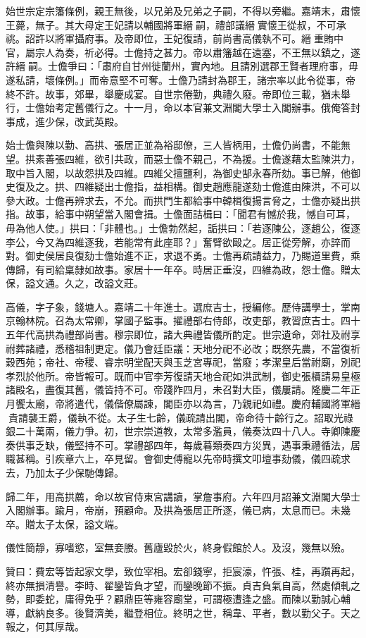 \begin{pinyinscope}
始世宗定宗籓條例，親王無後，以兄弟及兄弟之子嗣，不得以旁繼。嘉靖末，肅懷王薨，無子。其大母定王妃請以輔國將軍縉𤏳嗣，禮部議縉𤏳實懷王從叔，不可承祧。詔許以將軍攝府事。及帝即位，王妃復請，前尚書高儀執不可。縉𤏳重賄中官，屬宗人為奏，祈必得。士儋持之甚力。帝以肅籓越在遠塞，不王無以鎮之，遂許縉𤏳嗣。士儋爭曰：「肅府自甘州徙蘭州，實內地。且請別選郡王賢者理府事，毋遂私請，壞條例。」而帝意堅不可奪。士儋乃請封為郡王，諸宗率以此令從事，帝終不許。故事，郊畢，舉慶成宴。自世宗倦勤，典禮久廢。帝即位三載，猶未舉行，士儋始考定舊儀行之。十一月，命以本官兼文淵閣大學士入閣辦事。俄俺答封事成，進少保，改武英殿。

始士儋與陳以勤、高拱、張居正並為裕邸僚，三人皆柄用，士儋仍尚書，不能無望。拱素善張四維，欲引共政，而惡士儋不親己，不為援。士儋遂藉太監陳洪力，取中旨入閣，以故怨拱及四維。四維父擅鹽利，為御史郜永春所劾。事已解，他御史復及之。拱、四維疑出士儋指，益相構。御史趙應龍遂劾士儋進由陳洪，不可以參大政。士儋再辨求去，不允。而拱門生都給事中韓楫復揚言脅之，士儋亦疑出拱指。故事，給事中朔望當入閣會揖。士儋面詰楫曰：「聞君有憾於我，憾自可耳，毋為他人使。」拱曰：「非體也。」士儋勃然起，詬拱曰：「若逐陳公，逐趙公，復逐李公，今又為四維逐我，若能常有此座耶？」奮臂欲毆之。居正從旁解，亦誶而對。御史侯居良復劾士儋始進不正，求退不勇。士儋再疏請益力，乃賜道里費，乘傳歸，有司給稟隸如故事。家居十一年卒。時居正垂沒，四維為政，怨士儋。贈太保，謚文通。久之，改謚文莊。

高儀，字子象，錢塘人。嘉靖二十年進士。選庶吉士，授編修。歷侍講學士，掌南京翰林院。召為太常卿，掌國子監事。擢禮部右侍郎，改吏部，教習庶吉士。四十五年代高拱為禮部尚書。穆宗即位，諸大典禮皆儀所酌定。世宗遺命，郊社及祔享祔葬諸禮，悉稽祖制更定。儀乃會廷臣議：天地分祀不必改；既祭先農，不當復祈穀西苑；帝社、帝稷、睿宗明堂配天與玉芝宮專祀，當廢；孝潔皇后當祔廟，別祀孝烈於他所。帝皆報可。既而中官李芳復請天地合祀如洪武制，御史張檟請易皇極諸殿名，盡復其舊，儀皆持不可。帝踐阼四月，未召對大臣，儀屢請。隆慶二年正月饗太廟，帝將遣代，儀偕僚屬諫，閣臣亦以為言，乃親祀如禮。慶府輔國將軍縉貴請襲王爵，儀執不從。太子生七齡，儀疏請出閣，帝命待十齡行之。詔取光祿銀二十萬兩，儀力爭。初，世宗崇道教，太常多濫員，儀奏汰四十八人。寺卿陳慶奏供事乏缺，儀堅持不可。掌禮部四年，每歲暮類奏四方災異，遇事秉禮循法，居職甚稱。引疾章六上，卒見留。會御史傅寵以先帝時撰文叩壇事劾儀，儀四疏求去，乃加太子少保馳傳歸。

歸二年，用高拱薦，命以故官侍東宮講讀，掌詹事府。六年四月詔兼文淵閣大學士入閣辦事。踰月，帝崩，預顧命。及拱為張居正所逐，儀已病，太息而已。未幾卒。贈太子太保，謚文端。

儀性簡靜，寡嗜慾，室無妾媵。舊廬毀於火，終身假館於人。及沒，幾無以殮。

贊曰：費宏等皆起家文學，致位宰相。宏卻錢寧，拒宸濠，忤張、桂，再躓再起，終亦無損清譽。李時、翟鑾皆負才望，而鑾晚節不振。貞吉負氣自高，然處傾軋之勢，即委蛇，庸得免乎？顧鼎臣等雍容廟堂，可謂極遭逢之盛。而陳以勤誠心輔導，獻納良多。後賢濟美，繼登相位。終明之世，稱韋、平者，數以勤父子。天之報之，何其厚哉。


\end{pinyinscope}